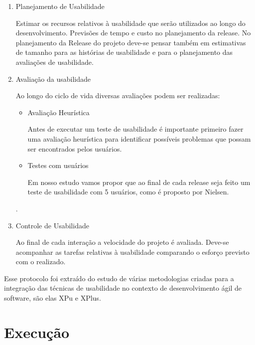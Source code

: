 \begin{enumerate}
		
\item Planejamento de Usabilidade

	Estimar os recursos relativos à usabilidade que serão utilizados ao longo do desenvolvimento. Previsões de tempo e custo no planejamento da release.
	 No planejamento da Release do projeto deve-se pensar também em estimativas de tamanho para as histórias de usabilidade e para o planejamento das avaliações de usabilidade.


\item Avaliação da usabilidade

	Ao longo do ciclo de vida diversas avaliações podem ser realizadas:
	
		
	\begin{itemize}
		\item Avaliação Heurística
		
		Antes de executar um teste de usabilidade é importante primeiro fazer uma avaliação heurística para identificar possíveis problemas que possam ser encontrados pelos usuários.
		
		\item Testes com usuários
		
		Em nosso estudo vamos propor que ao final de cada release seja feito um teste de usabilidade com 5 usuários, como é proposto por Nielsen.
				
	\end{itemize} 
	.
	
\item Controle de Usabilidade
	
	Ao final de cada interação a velocidade do projeto é avaliada. Deve-se acompanhar as tarefas relativas à usabilidade comparando o esforço previsto com o realizado.
	
\end{enumerate}
Esse protocolo foi extraído do estudo de várias metodologias criadas para a integração das técnicas de usabilidade no contexto de desenvolvimento ágil de software, são elas XPu e XPlus.
 
 
 
\section{Execução}


